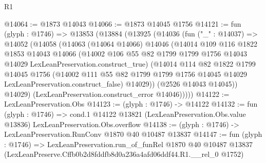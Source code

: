 \begin{lexlean}{R1}
\begin{coremodule}
@14064 := @1873 @14043
@14066 := @1873 @14045 @1756
@14121 := fun (glyph : @1746) =>
  @13853
    (@13884
      (@13925
        (@14036
          (fun ("_" : @14037) =>
          @14052
            (@14058
              (@14063
                (@14064 @14066)
                @14046
                (@14014
                  @109
                  @116
                  @1822
                  @1853
                  @14043
                  @14066
                  (@14002
                    @106
                    @55
                    @82
                    @1799
                    @1799
                    @1756
                    @14043
                    @14029
                    LexLeanPreservation.construct_true)
                  (@14014
                    @114
                    @82
                    @1822
                    @1799
                    @14045
                    @1756
                    (@14002
                      @111
                      @55
                      @82
                      @1799
                      @1799
                      @1756
                      @14045
                      @14029
                      LexLeanPreservation.construct_false)
                    @14029))
                (@2526 @14043 @14045))
              @14029)
            (LexLeanPreservation.construct_error @14046)))))
@14122 := LexLeanPreservation.Obs
@14123 := (glyph : @1746) -> @14122
@14132 := fun (glyph : @1746) =>
  cond.{1} @14122 @13821 (LexLeanPreservation.Obs.value @13836) LexLeanPreservation.Obs.overflow
@14138 := (glyph : @1746) -> LexLeanPreservation.RunConv @1870 @40 @10487 @13837
@14147 := fun (glyph : @1746) =>
  LexLeanPreservation.run_of_funRel
    @1870
    @40
    @10487
    @13837
    (LexLeanPreserve.Cffb0b2d8fddfb8d0a236a4afd06ddf44.R1.__rel_0 @1752)
\end{coremodule}
\end{lexlean}
